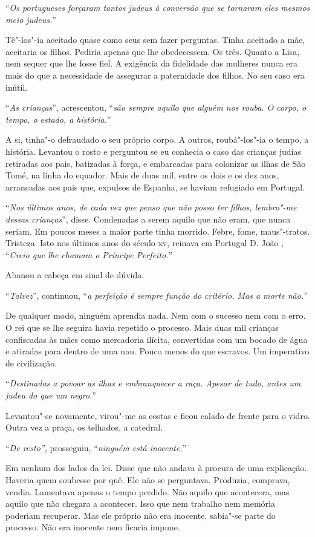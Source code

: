 ``\emph{Os portugueses forçaram tantos judeus à conversão que se tornaram
eles mesmos meio judeus.}''

Tê"-los"-ia aceitado quase como seus sem fazer perguntas. Tinha aceitado
a mãe, aceitaria os filhos. Pediria apenas que lhe obedecessem. Os três.
Quanto a Lisa, nem sequer que lhe fosse fiel. A exigência da fidelidade
das mulheres nunca era mais do que a necessidade de assegurar a
paternidade dos filhos. No seu caso era inútil.

``\emph{As crianças}'',
acrescentou,
``\emph{são sempre aquilo que alguém nos rouba. O corpo, o tempo, o
estado, a história.}''

A si, tinha"-o defraudado o seu próprio corpo. A outros, roubá"-los"-ia
o tempo, a história. Levantou o rosto e perguntou se eu conhecia o caso
das crianças judias retiradas aos pais, batizadas à força, e embarcadas
para colonizar as ilhas de São Tomé, na linha do equador. Mais de duas
mil, entre os dois e os dez anos, arrancadas aos pais que, expulsos de
Espanha, se haviam refugiado em Portugal.

``\emph{Nos últimos anos, de cada vez que penso que não posso ter filhos,
lembro"-me dessas crianças}'',
disse. Condenadas a serem aquilo que não eram, que nunca seriam. Em
poucos meses a maior parte tinha morrido. Febre, fome, maus"-tratos.
Tristeza. Isto nos últimos anos do século xv, reinava em Portugal D.
João ,
``\emph{Creio que lhe chamam o Príncipe Perfeito.}''

Abanou a cabeça em sinal de dúvida.

``\emph{Talvez}'',
continuou,
``\emph{a perfeição é sempre função do critério. Mas a morte não.}''

De qualquer modo, ninguém aprendia nada. Nem com o sucesso nem com o
erro. O rei que se lhe seguira havia repetido o processo. Mais duas mil
crianças confiscadas às mães como mercadoria ilícita, convertidas com um
bocado de água e atiradas para dentro de uma nau. Pouco menos do que
escravos. Um imperativo de civilização.

``\emph{Destinadas a povoar as ilhas e embranquecer a raça. Apesar de
tudo, antes um judeu do que um negro.}''

Levantou"-se novamente, virou"-me as costas e ficou calado de frente
para o vidro. Outra vez a praça, os telhados, a catedral.

``\emph{De resto'',}
prosseguiu,
``\emph{ninguém está inocente.}''

Em nenhum dos lados da lei. Disse que não andava à procura de uma
explicação. Haveria quem soubesse por quê. Ele não se perguntava.
Produzia, comprava, vendia. Lamentava apenas o tempo perdido. Não aquilo
que acontecera, mas aquilo que não chegara a acontecer. Isso que nem
trabalho nem memória poderiam recuperar. Mas ele próprio não era
inocente, sabia"-se parte do processo. Não era inocente nem ficaria
impune.

